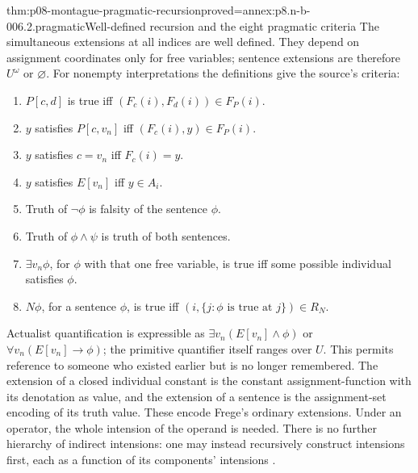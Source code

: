 \begin{hblemma}{thm:p08-montague-pragmatic-recursion}{proved=annex:p8.n-b-006.2.pragmatic}{Well-defined recursion and the eight pragmatic criteria}
The simultaneous extensions at all indices are well defined. They depend
on assignment coordinates only for free variables; sentence extensions
are therefore \(U^\omega\) or \(\varnothing\).
For nonempty interpretations the definitions give the source's criteria:
\begin{enumerate}
\item \(P[c,d]\) is true iff \((F_c(i),F_d(i))\in F_P(i)\).
\item \(y\) satisfies \(P[c,v_n]\) iff \((F_c(i),y)\in F_P(i)\).
\item \(y\) satisfies \(c=v_n\) iff \(F_c(i)=y\).
\item \(y\) satisfies \(E[v_n]\) iff \(y\in A_i\).
\item Truth of \(\neg\phi\) is falsity of the sentence \(\phi\).
\item Truth of \(\phi\land\psi\) is truth of both sentences.
\item \(\exists v_n\phi\), for \(\phi\) with that one free variable,
      is true iff some possible individual satisfies \(\phi\).
\item \(N\phi\), for a sentence \(\phi\), is true iff
      \((i,\{j:\phi\text{ is true at }j\})\in R_N\).
\end{enumerate}
\end{hblemma}

Actualist quantification is expressible as
\(\exists v_n(E[v_n]\land\phi)\) or
\(\forall v_n(E[v_n]\to\phi)\); the primitive quantifier itself ranges
over \(U\). This permits reference to someone who existed earlier but
is no longer remembered. The extension of a closed individual constant
is the constant assignment-function with its denotation as value, and
the extension of a sentence is the assignment-set encoding of its truth
value. These encode Frege's ordinary extensions. Under an operator,
the whole intension of the operand is needed. There is no further
hierarchy of indirect intensions: one may instead recursively construct
intensions first, each as a function of its components' intensions
\cite[pp.~75--76]{Montague1970Pragmatics}.

